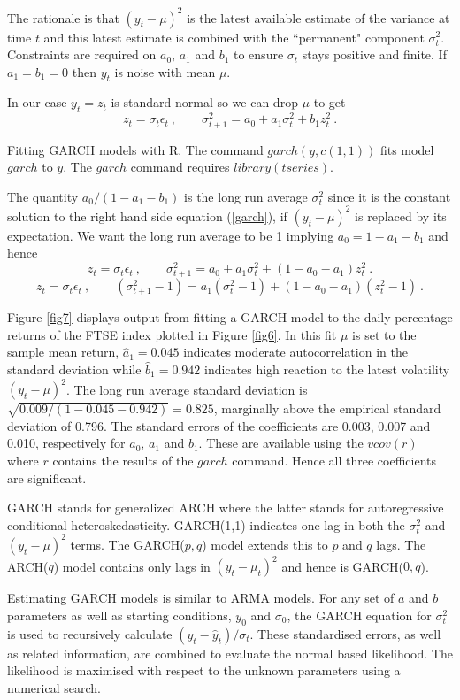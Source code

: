 \documentclass[authoryear]{elsarticle}
\newcommand{\eps}{\epsilon}
\newcommand{\eref}[1]{(\ref{#1})}
\newcommand{\fref}[1]{Figure \ref{#1}}
\newcommand{\cq}{\ , \qquad}
\begin{document}
   
The rationale is that  $(y_{t}-\mu)^2$ is the latest available estimate of the variance at time $t$ and this latest   estimate is combined with the  ``permanent" component $\sigma^2_{t}$.   Constraints  are required on $a_0$, $a_1$ and $b_1$ to ensure $\sigma_t$ stays positive and finite.  If  $a_1=b_1=0$ then $y_t$ is noise with mean $\mu$. 

In our case $y_t=z_t$ is standard normal so we can drop $\mu$ to get
$$
z_t=  \sigma_t\eps_t\cq \sigma^2_{t+1} = a_0+a_1 \sigma^2_{t} + b_1z_t^2\ .
$$ 


Fitting GARCH models with R.  The  command $garch(y,c(1,1))$ fits  model $garch$ to $y$.  The $garch$ command requires $library(tseries)$. 

The quantity $a_0/(1-a_1-b_1)$ is the long run average $\sigma^2_t$ since it is the constant solution to the right hand side equation \eref{garch}, if  $(y_t-\mu)^2$ is replaced by its expectation.    We want the long run average to be 1 implying
$
a_0=1-a_1-b_1
$ and hence
$$
z_t=  \sigma_t\eps_t\cq \sigma^2_{t+1} = a_0+a_1 \sigma^2_{t} + (1-a_0-a_1)z_t^2\ .
$$
$$
z_t=  \sigma_t\eps_t\cq (\sigma^2_{t+1}-1) = a_1 (\sigma^2_{t}-1) + (1-a_0-a_1)(z_t^2-1)\ .
$$



 \fref{fig7} displays output from fitting a GARCH model to the daily percentage returns of the FTSE index plotted in \fref{fig6}.   In this fit  $\mu$ is set to the sample mean return, $\hat a_1=0.045$ indicates moderate autocorrelation in the standard deviation while $\hat b_1= 0.942$ indicates high reaction to the latest volatility $(y_t-\mu)^2$.  The long run average standard deviation is $\sqrt{0.009/(1-0.045-0.942)}=0.825$, marginally above the empirical standard deviation of 0.796.   The  standard errors of the coefficients are 0.003, 0.007 and 0.010, respectively for $a_0$, $a_1$ and $b_1$.  These are available using the $vcov(r)$ where $r$ contains the results of the $garch$ command.  Hence all three coefficients are significant.

GARCH stands for generalized ARCH where the latter stands for autoregressive conditional heteroskedasticity.    GARCH(1,1) indicates one lag in both the $\sigma_t^2$ and $(y_t-\mu)^2$ terms.   The GARCH($p,q$) model extends this to $p$ and $q$ lags.   The  ARCH($q$) model contains only lags in $(y_{t}-\mu_t)^2$  and hence is GARCH($0,q$).   
    
Estimating GARCH models is similar to ARMA models.   For any set of $a$ and $b$ parameters as well as starting conditions,  $y_0$ and $\sigma_0$,   the GARCH equation for $\sigma_t^2$  is used to recursively calculate $(y_t-\hat y_{t})/\sigma_t$.  These standardised errors, as well as related information,  are combined to evaluate the normal based likelihood.   The likelihood is maximised  with respect to the unknown parameters using a numerical search. 
\end{document}
